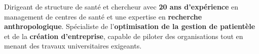 
\begin{cvparagraph}
Dirigeant de structure de santé et chercheur avec \textbf{20 ans d'expérience} en management de centres de santé et une expertise en \textbf{recherche anthropologique}. Spécialiste de l'\textbf{optimisation de la gestion de patientèle} et de la \textbf{création d'entreprise}, capable de piloter des organisations tout en menant des travaux universitaires exigeants.
\end{cvparagraph}
